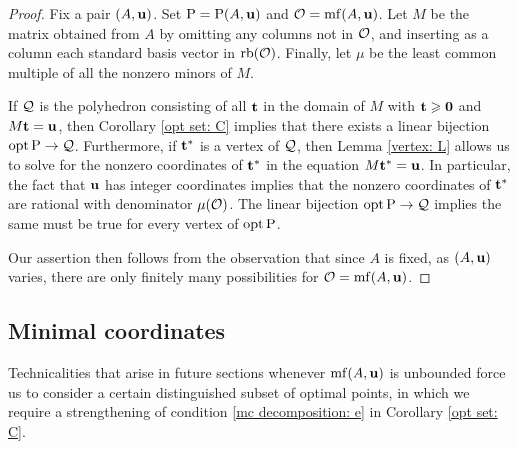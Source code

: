 \documentclass[11pt]{amsart}
\renewcommand{\!}[1]{{\color{red}\text{$\star$\,}#1\,$\star$}}
\begin{document}
\begin{proof}

Fix a pair $(A, \mathbf{u})$. Set $\mathrm{P} = \mathrm{P}(A, \mathbf{u})$ and $\mathcal{O} = \operatorname{mf}(A, \mathbf{u})$.  Let $M$ be the matrix obtained from $A$ by omitting any columns not in $\mathcal{O}$, and inserting as a column each standard basis vector in $\operatorname{rb}(\mathcal{O})$.  Finally, let $\mu$ be the least common multiple of all the nonzero minors of $M$.

If $\mathcal{Q}$ is the polyhedron consisting of all $\mathbf{t}$ in the domain of $M$ with $\mathbf{t} \geqslant \mathbf{0}$ and $M \mathbf{t} = \mathbf{u}$, then Corollary \ref{opt set: C} implies that there exists a linear bijection $\operatorname{opt} \mathrm{P} \to \mathcal{Q}$.  Furthermore, if $\mathbf{t}^{\ast}$ is a vertex of $\mathcal{Q}$, then Lemma \ref{vertex: L} allows us to solve for the nonzero coordinates of $\mathbf{t}^{\ast}$ in the equation $M \mathbf{t}^{\ast} = \mathbf{u}$.  In particular, the fact that $\mathbf{u}$ has integer coordinates implies that the nonzero coordinates of $\mathbf{t}^{\ast}$ are rational with denominator $\mu(\mathcal{O})$.  The linear bijection $\operatorname{opt} \mathrm{P} \to \mathcal{Q}$ implies the same must be true for every vertex of $\operatorname{opt} \mathrm{P}$.

Our assertion then follows from the observation that since $A$ is fixed, as $(A, \mathbf{u})$ varies, there are only finitely many possibilities for $\mathcal{O} = \operatorname{mf}(A, \mathbf{u})$.
\end{proof}


\subsection{Minimal coordinates}



Technicalities that arise in future sections whenever $\operatorname{mf}(A, \mathbf{u})$ is unbounded force us to consider a certain distinguished subset of optimal points, in which we require a strengthening of condition \eqref{mc decomposition: e} in Corollary \ref{opt set: C}.
\end{document}
